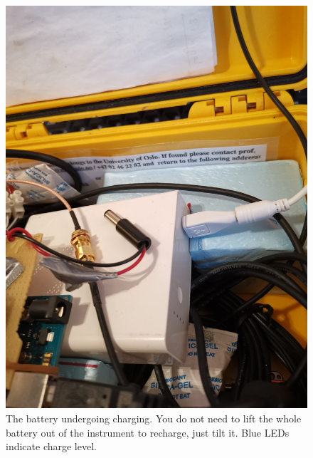 \documentclass[pdftex,a4paper,12pt,twocolumn,fleqn,captions=tableheading]{scrartcl}
\begin{document}
  \begin{figure}
  \begin{center}
  \includegraphics[width=.8\textwidth]{Figures/battery_lift_to_charge}
  \caption{The battery undergoing charging. You do not need to lift the whole battery out of the instrument to recharge, just tilt it. Blue LEDs indicate charge level.}
  \end{center}
  \end{figure}
\end{document}
